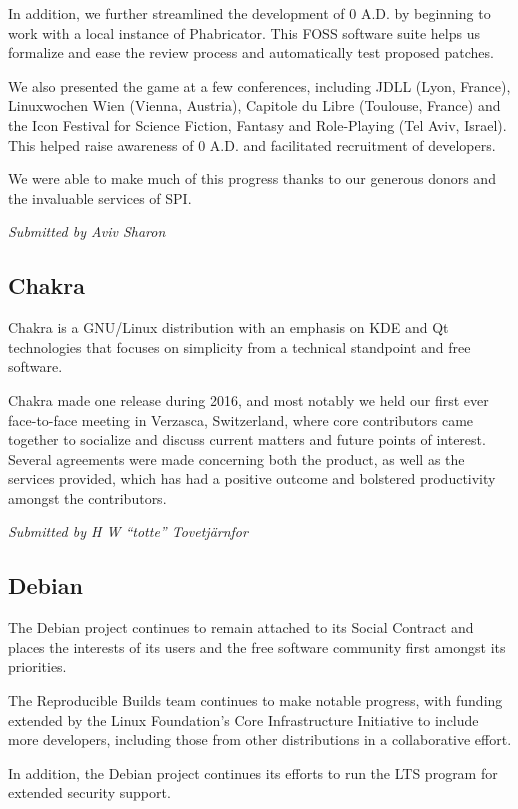 \documentclass[letterpaper]{report}
\begin{document}
In addition, we further streamlined the development of 0 A.D. by
beginning to work with a local instance of Phabricator. This FOSS
software suite helps us formalize and ease the review process and
automatically test proposed patches.

We also presented the game at a few conferences, including JDLL (Lyon,
France), Linuxwochen Wien (Vienna, Austria), Capitole du Libre
(Toulouse, France) and the Icon Festival for Science Fiction, Fantasy
and Role-Playing (Tel Aviv, Israel). This helped raise awareness of 0
A.D. and facilitated recruitment of developers.

We were able to make much of this progress thanks to our generous donors
and the invaluable services of SPI.

{\em Submitted by Aviv Sharon}

\subsection{Chakra}

Chakra is a GNU/Linux distribution with an emphasis on KDE and Qt
technologies that focuses on simplicity from a technical standpoint and
free software.

Chakra made one release during 2016, and most notably we held our first
ever face-to-face meeting in Verzasca, Switzerland, where core
contributors came together to socialize and discuss current matters and
future points of interest. Several agreements were made concerning both
the product, as well as the services provided, which has had a positive
outcome and bolstered productivity amongst the contributors.

{\em Submitted by H W ``totte'' Tovetjärnfor}

\subsection{Debian}

The Debian project continues to remain attached to its Social Contract
and places the interests of its users and the free software community
first amongst its priorities.

The Reproducible Builds team continues to make notable progress, with
funding extended by the Linux Foundation's Core Infrastructure
Initiative to include more developers, including those from other
distributions in a collaborative effort.

In addition, the Debian project continues its efforts to run the LTS
program for extended security support.
\end{document}
